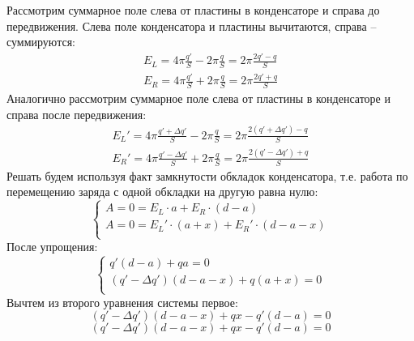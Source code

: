 \documentclass[a4paper,14pt]{extarticle}
\begin{document}
\begin{figure}[H]
    \centering
\end{figure}
Рассмотрим суммарное поле слева от пластины в конденсаторе и справа до передвижения. Слева поле конденсатора и пластины вычитаются, справа -- суммируются:
\begin{gather}
	E_L=4\pi\frac{q'}{S}-2\pi\frac{q}{S}=2\pi\frac{2q'-q}{S}\\
	E_R=4\pi\frac{q'}{S}+2\pi\frac{q}{S}=2\pi\frac{2q'+q}{S}
\end{gather}
Аналогично рассмотрим суммарное поле слева от пластины в конденсаторе и справа после передвижения:
\begin{gather}
	E_L'=4\pi\frac{q'+\Delta q'}{S}-2\pi\frac{q}{S}=2\pi\frac{2(q'+\Delta q')-q}{S}\\
	E_R'=4\pi\frac{q'-\Delta q'}{S}+2\pi\frac{q}{S}=2\pi\frac{2(q'-\Delta q')+q}{S}
\end{gather}
Решать будем используя факт замкнутости обкладок конденсатора, т.е. работа по перемещению заряда с одной обкладки на другую равна нулю:
\begin{equation}
	\begin{cases}
		A=0=E_L\cdot a+E_R\cdot (d-a)\\
		A=0=E_L'\cdot (a+x)+E_R'\cdot (d-a-x)\\
	\end{cases}	
\end{equation}
После упрощения:
\begin{equation}
	\begin{cases}
		q'(d-a)+qa=0\\
		(q'-\Delta q')(d-a-x)+q(a+x)=0\\
	\end{cases}	
\end{equation}
Вычтем из второго уравнения системы первое:
\begin{equation}
	(q'-\Delta q')(d-a-x)+qx-q'(d-a)=0
\end{equation}
\begin{equation}
	(q'-\Delta q')(d-a-x)+qx-q'(d-a)=0
\end{equation}
\end{document}
